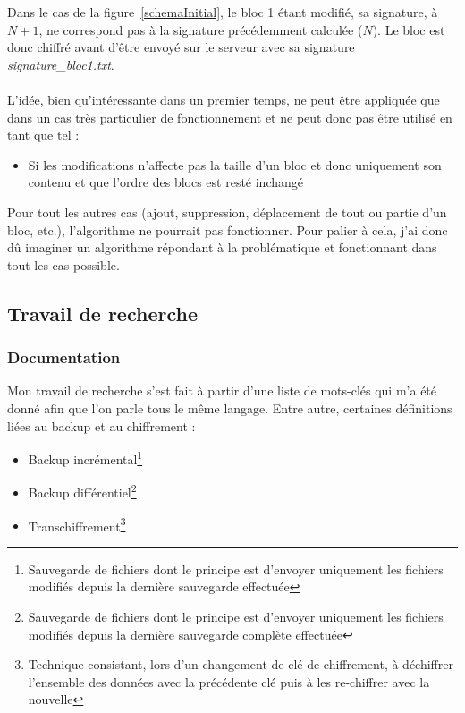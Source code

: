 \documentclass[a4paper,10pt, twoside]{report}
\begin{document}
\begin{spacing}{1.2}
Dans le cas de la figure~\ref{schemaInitial}, le bloc 1 \'etant modifi\'e, sa
signature, \`a \(N + 1\), ne correspond pas \`a la signature pr\'ec\'edemment
calcul\'ee (\(N\)). Le bloc est donc chiffr\'e avant d'\^etre envoy\'e sur le
serveur avec sa signature \textit{signature\_bloc1.txt}.

\paragraph{}
L'id\'ee, bien qu'int\'eressante dans un premier temps, ne peut \^etre
appliqu\'ee que dans un cas tr\`es particulier de fonctionnement et ne peut
donc pas \^etre utilis\'e en tant que tel :
\begin{itemize}
 \item Si les modifications n'affecte pas la taille d'un bloc et donc
 uniquement son contenu et que l'ordre des blocs est rest\'e inchang\'e
\end{itemize}

Pour tout les autres cas (ajout, suppression, d\'eplacement de tout ou partie
d'un bloc, etc.), l'algorithme ne pourrait pas fonctionner. Pour palier \`a
cela, j'ai donc d\^u imaginer un algorithme r\'epondant \`a la probl\'ematique
et fonctionnant dans tout les cas possible.

\subsection{Travail de recherche}
\label{secTravailRecherche}
\subsubsection{Documentation}
Mon travail de recherche s'est fait \`a partir d'une liste de mots-cl\'es qui
m'a \'et\'e donn\'e afin que l'on parle tous le m\^eme langage. Entre autre,
certaines d\'efinitions li\'ees au backup et au chiffrement :
\begin{itemize}
 \item Backup incr\'emental\footnote{Sauvegarde de fichiers dont le principe est
 d'envoyer uniquement les fichiers modifi\'es depuis la derni\`ere sauvegarde
 effectu\'ee}
 \item Backup diff\'erentiel\footnote{Sauvegarde de fichiers dont le principe
 est d'envoyer uniquement les fichiers modifi\'es depuis la derni\`ere
 sauvegarde compl\`ete effectu\'ee}
 \item Transchiffrement\footnote{Technique consistant, lors d'un changement
 de cl\'e de chiffrement, \`a d\'echiffrer l'ensemble des donn\'ees avec la
 pr\'ec\'edente cl\'e puis \`a les re-chiffrer avec la nouvelle}
\end{itemize}


\end{spacing}
\end{document}
